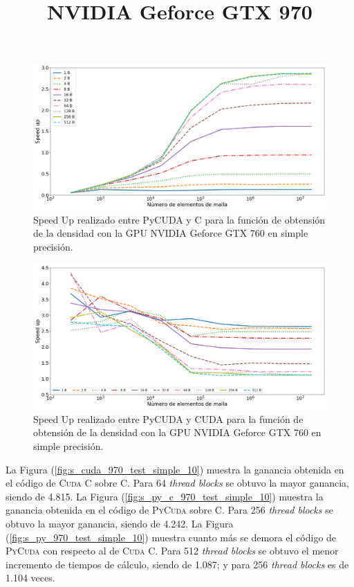 \begin{figure}[h!]
	\centering
	\includegraphics[width=\textwidth]{figs/cap4/s_py_c_760_test_simple_10}
	\caption{Speed Up realizado entre PyCUDA y C para la función de obtensión de la densidad con la GPU NVIDIA Geforce GTX 760 en simple precisión.} 
	\label{fig:s_py_c_760_test_simple_10}	
\end{figure}


\begin{figure}[h!]
	\centering
	\includegraphics[width=\textwidth]{figs/cap4/s_py_760_test_simple_10}
	\caption{Speed Up realizado entre PyCUDA y CUDA para la función de obtensión de la densidad con la GPU NVIDIA Geforce GTX 760 en simple precisión.} 
	\label{fig:s_py_760_test_simple_10}	
\end{figure}



%
\title{\textbf{NVIDIA Geforce GTX 970}}

La Figura (\ref{fig:s_cuda_970_test_simple_10}) muestra la ganancia obtenida en el código de \textsc{Cuda C} sobre \textsc{C}. Para 64 \textit{thread blocks} se obtuvo la mayor ganancia, siendo de 4.815. La Figura (\ref{fig:s_py_c_970_test_simple_10}) muestra la ganancia obtenida en el código de \textsc{PyCuda} sobre \textsc{C}. Para 256 \textit{thread blocks} se obtuvo la mayor ganancia, siendo de 4.242. La Figura (\ref{fig:s_py_970_test_simple_10}) muestra cuanto más se demora el código de \textsc{PyCuda} con respecto al de \textsc{Cuda C}. Para 512  \textit{thread blocks} se obtuvo el menor incremento de tiempos de cálculo, siendo de 1.087; y para 256 \textit{thread blocks} es de 1.104 veces.

